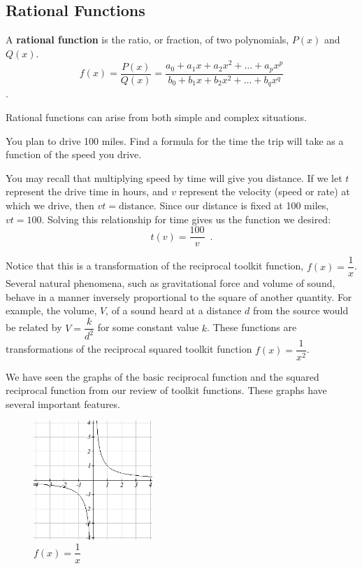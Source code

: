 \subsection{Rational Functions}
\label{ssec:rational}
\begin{definition}
  A {\bf rational function} is the ratio, or fraction, of two polynomials, \(P(x)\) and \(Q(x)\).
	\[f(x)=\dfrac{P(x)}{Q(x)}=\dfrac{a_0+a_1 x+a_2 x^2+\dots+a_p x^p}{b_0+b_1 x+b_2 x^2+\dots+b_q x^q}\].
  \end{definition}
  Rational functions can arise from both simple and complex situations.

\begin{example}
You plan to drive 100 miles. Find a formula for the time the trip will take as a function of the speed you drive.

\begin{solution} You may recall that multiplying speed by time will give you distance. If we let $t$ represent the drive time in hours, and $v$ represent the velocity (speed or rate) at which we drive, then $vt=\mbox{distance}$. Since our distance is fixed at 100 miles, $vt=100$. Solving this relationship for time gives us the function we desired:
$$t(v)=\dfrac{100}{v}\enspace .$$
\end{solution}\end{example}

Notice that this is a transformation of the reciprocal toolkit function, $f(x)=\dfrac{1}{x}$. Several natural phenomena, such as gravitational force and volume of sound, behave in a manner inversely proportional to the square of another quantity. For example, the volume, $V$, of a sound heard at a distance $d$ from the source would be related by $V=\dfrac{k}{d^2}$ for some constant value $k$. These functions are transformations of the reciprocal squared toolkit function $f(x)=\dfrac{1}{x^2}$.

We have seen the graphs of the basic reciprocal function and the squared reciprocal function from our review of toolkit functions. These graphs have several important features.

\begin{figure}[!ht]
\centering
\includegraphics[width=0.4\textwidth]{img/chap1/sec1-5/image070.png}
\caption{$f(x)=\dfrac{1}{x}$}
\end{figure}

